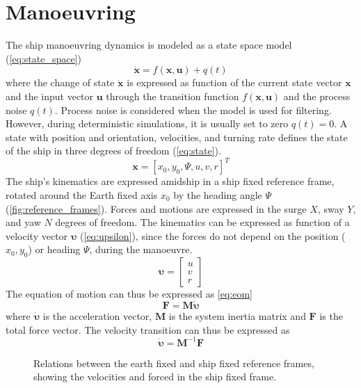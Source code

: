 \section{Manoeuvring} \label{sec:manoeuvring}
The ship manoeuvring dynamics is modeled as a state space model (\autoref{eq:state_space})
\begin{equation}
    \dot{\mathbf{x}}=f(\mathbf{x},\mathbf{u}) + q(t)
    \label{eq:state_space}
\end{equation}
where the change of state $\dot{\mathbf{x}}$ is expressed as function of the current state vector $\mathbf{x}$ and the input vector $\mathbf{u}$ through the transition function $f(\mathbf{x},\mathbf{u})$ and the process noise $q(t)$.  Process noise is considered when the model is used for filtering. However,  during deterministic simulations, it is usually set to zero $q(t)=0$.
A state with position and orientation, velocities, and turning rate defines the state of the ship in three degrees of freedom (\autoref{eq:state}). 
\begin{equation}
    \mathbf{x} = [x_0,y_0,\Psi, u,v,r]^T
    \label{eq:state}
\end{equation}
The ship’s kinematics are expressed amidship in a ship fixed reference frame, rotated around the Earth fixed axis $x_0$ by the heading angle $\Psi$ (\autoref{fig:reference_frames}). Forces and motions are expressed in the surge $X$, sway $Y$, and yaw $N$ degrees of freedom. The kinematics can be expressed as function of a velocity vector $\pmb{\bm{\upsilon}}$ (\autoref{eq:upsilon}), since the forces do not depend on the position ($x_0,y_0$) or heading $\Psi$, during the manoeuvre.
\begin{equation}
    \label{eq:upsilon}
    \pmb{\bm{\upsilon}} = \left[\begin{matrix}u\\v\\r\end{matrix}\right]
\end{equation}
The equation of motion can thus be expressed as \autoref{eq:eom}
\begin{equation}
    \label{eq:eom}
    \mathbf{F} = \mathbf{M}  \pmb{\bm{\dot{\upsilon}}} 
\end{equation}
where $\pmb{\bm{\dot{\upsilon}}}$ is the acceleration vector, $\mathbf{M}$ is the system inertia matrix and $\mathbf{F}$ is the total force vector.
The velocity transition can thus be expressed as
\begin{equation}
    \label{eq:acc}
    \pmb{\bm{\dot{\upsilon}}} = \mathbf{M}^{-1}\mathbf{F}
\end{equation}
\begin{figure}[h]
    \centering
    
    \caption{Relations between the earth fixed and ship fixed reference frames, showing the velocities and forced in the ship fixed frame.}
    \label{fig:reference_frames}
\end{figure}

